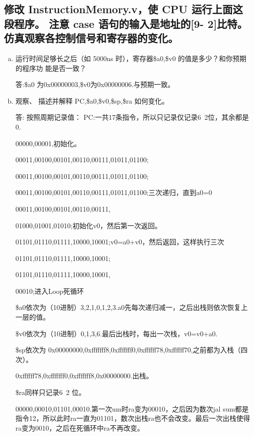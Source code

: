 \documentclass{ctexart}
\begin{document}
         \subsection{修改 InstructionMemory.v，使 CPU 运行上面这段程序。 注意 case 语句的输入是地址的[9-
         2]比特。 仿真观察各控制信号和寄存器的变化。}
         \begin{enumerate}[a)]

             \item{ 运行时间足够长之后（如 5000ns 时），寄存器\$a0,\$v0 的值是多少？和你预期的程序功
                 能是否一致？}

                 答:\$a0 为0x00000003,\$v0为0x00000006.与预期一致。

             \item{观察、 描述并解释 PC,\$a0,\$v0,\$sp,\$ra 如何变化。}

                 答: 按照周期记录值：
                 PC:一共17条指令，所以只记录仅记录6~2位，其余都是0.

                 00000,00001,初始化。

                 00011,00100,00101,00110,00111,01011,01100;

                 00011,00100,00101,00110,00111,01011,01100;

                 00011,00100,00101,00110,00111,01011,01100;三次递归，直到a0=0

                 00011,00100,00101,00110,00111,

                 01000,01001,01010;初始化v0，然后第一次返回。

                 01101,01110,01111,10000,10001;v0=a0+v0，然后返回，这样执行三次

                 01101,01110,01111,10000,10001;

                 01101,01110,01111,10000,10001,

                 00010;进入Loop死循环

                 \$a0依次为（10进制）3,2,1,0,1,2,3.a0先每次递归减一，之后出栈则依次恢复上一层的值。

                 \$v0依次为（10进制）0,1,3,6.最后出栈时，每出一次栈，v0=v0+a0.

                 \$sp依次为 0x00000000,0xfffffff8,0xfffffff0,0xffffff78,0xffffff70,之前都为入栈（四次）。

                 0xffffff78,0xfffffff0,0xfffffff8,0x00000000.出栈。

                 \$ra同样只记录6~2 位。

                 00000,00010,01101,00010.第一次um时ra变为00010，之后因为数次jal sum都是指令12，所以此时ra一直为01101，数次出栈ra也不会改变。最后一次出栈使得ra变为0010，之后在死循环中ra不再改变。
         \end{enumerate}
         
\end{document}
